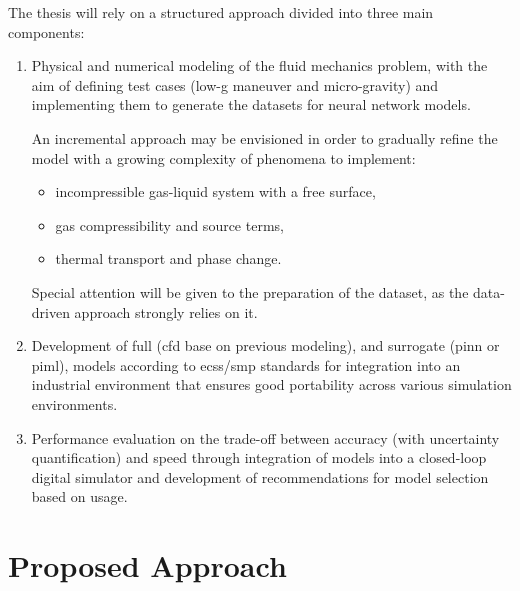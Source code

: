 \documentclass[12pt]{article}
\begin{document}
	The thesis will rely on a structured approach divided into three main components:
	\begin{enumerate}
		\item Physical and numerical modeling of the fluid mechanics problem, with the aim of defining test cases (low-g maneuver and micro-gravity) and implementing them to generate the datasets for neural network models.
		
		An incremental approach may be envisioned in order to gradually refine the model with a growing complexity of phenomena to implement:
		\begin{itemize}
			\item incompressible gas-liquid system with a free surface,
			\item gas compressibility and source terms,
			\item thermal transport and phase change.
		\end{itemize}
		
		Special attention will be given to the preparation of the dataset, as the data-driven approach strongly relies on it.
		
		\item Development of full (\acrshort{cfd} base on previous modeling),  and surrogate (\acrshort{pinn} or \acrshort{piml}), models according to \acrshort{ecss}/\acrshort{smp} standards for integration into an industrial environment that ensures good portability across various simulation environments.
		
		\item Performance evaluation on the trade-off between accuracy (with uncertainty quantification) and speed through integration of models into a closed-loop digital simulator and development of recommendations for model selection based on usage.
	\end{enumerate}
	
	\section*{Proposed Approach}
	
\end{document}
